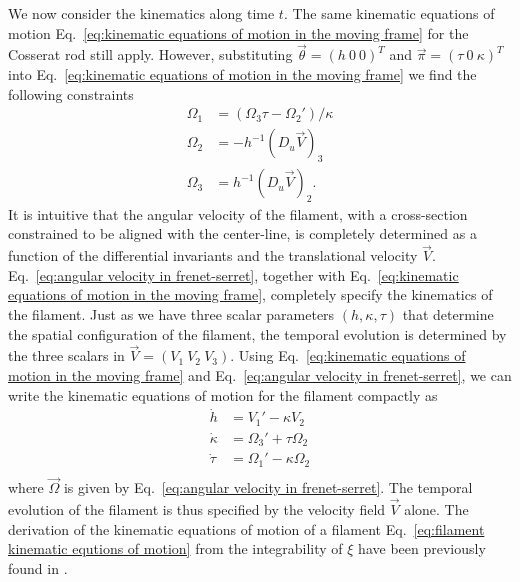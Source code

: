 We now consider the kinematics along time $t$. The same kinematic equations of motion Eq.~\ref{eq:kinematic equations of motion in the moving frame} for the Cosserat rod still apply. However, substituting $\vec{\theta} = (h\ 0\ 0)^T$ and $\vec{\pi} = (\tau\ 0\ \kappa)^T$ into Eq.~\ref{eq:kinematic equations of motion in the moving frame} we find the following constraints
\begin{subequations} \label{eq:angular velocity in frenet-serret}
\begin{align}
\Omega_1 & = (\Omega_3 \tau - \Omega_2') / \kappa \\
\Omega_2 & = - h^{-1} (D_u \vec{V})_3 \\
\Omega_3 & = h^{-1} (D_u \vec{V})_2.
\end{align}
\end{subequations}
It is intuitive that the angular velocity of the filament, with a cross-section constrained to be aligned with the center-line, is completely determined as a function of the differential invariants and the translational velocity $\vec{V}$. Eq.~\ref{eq:angular velocity in frenet-serret}, together with Eq.~\ref{eq:kinematic equations of motion in the moving frame}, completely specify the kinematics of the filament. Just as we have three scalar parameters $(h, \kappa, \tau)$ that determine the spatial configuration of the filament, the temporal evolution is determined by the three scalars in $\vec{V} = (V_1\ V_2\ V_3)$. Using Eq.~\ref{eq:kinematic equations of motion in the moving frame} and Eq.~\ref{eq:angular velocity in frenet-serret}, we can write the kinematic equations of motion for the filament compactly as
\begin{subequations} \label{eq:filament kinematic equtions of motion}
\begin{align}
\dot{h} & = V_1' - \kappa V_2 \\
\dot{\kappa} & = \Omega_3' + \tau \Omega_2 \\
\dot{\tau} & = \Omega_1' - \kappa \Omega_2 \\
\end{align}
\end{subequations}
where $\vec{\Omega}$ is given by Eq.~\ref{eq:angular velocity in frenet-serret}. The temporal evolution of the filament is thus specified by the velocity field $\vec{V}$ alone. The derivation of the kinematic equations of motion of a filament Eq.~\ref{eq:filament kinematic equtions of motion} from the integrability of $\xi$ have been previously found in \citep{zhenyuelimUnpublishedWork}.

